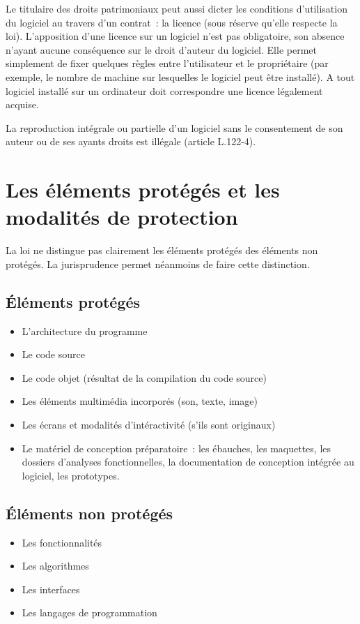 \documentclass[pdftex,a4paper,11pt]{report}
\begin{document}
Le titulaire des droits patrimoniaux peut aussi dicter les conditions d'utilisation du logiciel au travers d'un contrat~: la licence (sous réserve qu'elle respecte la loi). L'apposition d'une licence sur un logiciel n'est pas obligatoire, son absence n'ayant aucune conséquence sur le droit d'auteur du logiciel. Elle permet simplement de fixer quelques règles entre l'utilisateur et le propriétaire (par exemple, le nombre de machine sur lesquelles le logiciel peut être installé). A tout logiciel installé sur un ordinateur doit correspondre une licence légalement acquise.

La reproduction intégrale ou partielle d'un logiciel sans le consentement de son auteur ou de ses ayants droits est illégale (article L.122-4).

\section{Les éléments protégés et les modalités de protection}
La loi ne distingue pas clairement les éléments protégés des éléments non protégés. La jurisprudence permet néanmoins de faire cette distinction.

\subsection{Éléments protégés}
\begin{itemize}
\item L'architecture du programme
\item Le code source
\item Le code objet (résultat de la compilation du code source)
\item Les éléments multimédia incorporés (son, texte, image)
\item Les écrans et modalités d'intéractivité (s'ils sont originaux)
\item Le matériel de conception préparatoire~: les ébauches, les maquettes, les dossiers d'analyses fonctionnelles, la documentation de conception intégrée au logiciel, les prototypes.
\end{itemize}

\subsection{Éléments non protégés}
\begin{itemize}
\item Les fonctionnalités
\item Les algorithmes
\item Les interfaces
\item Les langages de programmation
\end{itemize}
\end{document}
